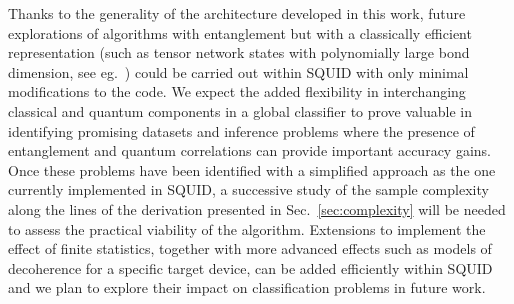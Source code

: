 Thanks to the generality of the architecture developed in this work, future explorations of algorithms with entanglement but with a classically efficient representation (such as tensor network states with polynomially large bond dimension, see eg.~\cite{Liu_2019,roberts2019tensornetwork}) could be carried out within SQUID with only minimal modifications to the code.
We expect the added flexibility in interchanging classical and quantum components in a global classifier to prove valuable in identifying promising datasets and inference problems where the presence of entanglement and quantum correlations can provide important accuracy gains.
Once these problems have been identified with a simplified approach as the one currently implemented in SQUID, a successive study of the sample complexity along the lines of the derivation presented in Sec.~\ref{sec:complexity} will be needed to assess the practical viability of the algorithm.
Extensions to implement the effect of finite statistics, together with more advanced effects such as models of decoherence for a specific target device, can be added efficiently within SQUID and we plan to explore their impact on classification problems in future work.

